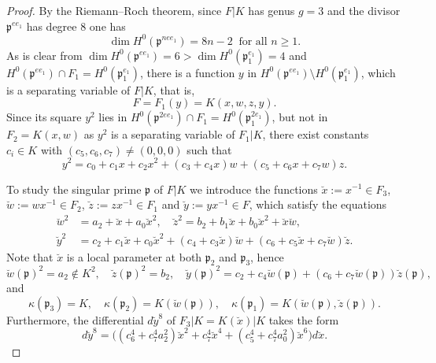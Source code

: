 \documentclass[12pt,reqno]{amsart}
\newcommand{\toda}[2][]{\todo[color=blue!30, #1]{#2}} %
\theoremstyle{definition}
\newcommand{\cx}{{\breve{x}}}
\newcommand{\cy}{{\breve{y}}}
\newcommand{\pp}{\mathfrak{p}}
\newcommand{\ka}{\kappa}
\begin{document}
\begin{proof}
By the Riemann--Roch theorem, since $F|K$ has genus $g = 3$ and the divisor $\pp^{ee_1}$ has degree $8$ one has
\[ \dim H^0 (\pp^{n e e_1}) = 8n - 2 \ \text{ for all $n\geq 1$.} \]
As is clear from $\dim H^0(\pp^{ee_1})=6 > \dim H^0(\pp_1^{e_1})=4$ and $H^0(\pp^{ee_1}) \cap F_1 = H^0(\pp_1^{e_1})$, there is a function $y$ in $H^0(\pp^{ee_1}) \setminus H^0(\pp_1^{e_1})$, which is a separating variable of $F|K$, that is, \[ F = F_1(y)=K(x,w,z,y). \]
Since its square $y^2$ lies in $H^0(\pp^{2ee_1}) \cap F_1 = H^0(\pp_1^{2e_1})$, but not in $F_2=K(x,w)$ as $y^2$ is a separating variable of $F_1|K$, there exist constants $c_i\in K$ with $(c_5, c_6, c_7)\neq(0,0,0)$ such that
\[ y^2 = c_0 + c_1 x + c_2 x^2 + (c_3 + c_4 x)w + (c_5 + c_6 x + c_7 w)z. \]

To study the singular prime $\pp$ of $F|K$ we introduce the functions $\breve{x} := x^{-1} \in F_3$, $\breve{w} := w x^{-1} \in F_2$, $\breve{z} := z x^{-1} \in F_1$ and $\cy := yx^{-1} \in F$, which satisfy the equations
\begin{align*}
    \breve{w}^2 &= a_2 + \breve{x} + a_0 \breve{x}^2, \quad \breve{z}^2 = b_2 + b_1 \breve{x} +b_0 \breve{x}^2 + \breve{x} \breve{w}, \\
    \cy^2 &= c_2 + c_1 \cx + c_0 \cx^2 + (c_4 + c_3 \cx)\breve{w} + (c_6 + c_5 \cx + c_7 \breve{w})\breve{z}.
\end{align*}
Note that $\cx$ is a local parameter at both $\pp_2$ and $\pp_3$, hence
\[ \breve{w}(\pp)^2 = a_2 \notin K^2, \quad \breve{z}(\pp)^2 = b_2, \quad \cy(\pp)^2 = c_2 + c_4 \breve{w}(\pp) + (c_6 + c_7 \breve{w}(\pp)) \breve{z}(\pp), \]
and
\[ \ka(\pp_3) = K, \quad \ka(\pp_2) = K(\breve{w}(\pp)), \quad \ka(\pp_1) = K(\breve{w}(\pp),\breve{z}(\pp)). \]
Furthermore, the differential $d\cy^8$ of $F_3|K=K(\cx)|K$ takes the form
\[ d\cy^8 = \big( ( c_6^4 + c_7^4 a_2^2) \cx^2 + c_7^4 \cx^4 + (c_5^4 + c_7^4 a_0^2)\cx^6 \big) d \cx.  \]



\end{proof}
\end{document}
